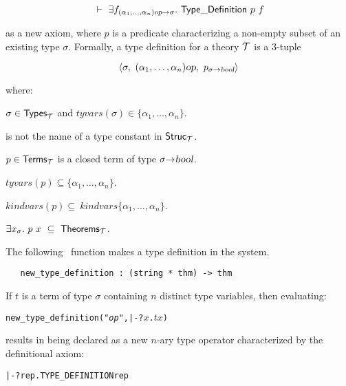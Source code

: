 \[\turn \equant{f_{(\alpha_1,\ldots,\alpha_n)\ty{op}\fun\sigma}}\TyDef\ p\ f\]

\noindent as a new axiom, where $p$ is a predicate
characterizing a
non-empty subset of an existing type $\sigma$.  Formally, a type definition
for a theory ${\cal T}$ is a $3$-tuple

\[ \langle \sigma,\ (\alpha_1,\ldots,\alpha_n)\ty{op},
    \ p_{\sigma\fun\ty{bool}}\rangle \]

\noindent where:

\begin{myenumerate}
\item $\sigma\in{\sf Types}_{\cal T}$  and
$tyvars(\sigma)\in\{\alpha_1, \ldots , \alpha_n\}$.
\item {} is not the name of a type constant in ${\sf Struc}_{\cal T}$.
\item $p\in{\sf Terms}_{\cal T}$ is a closed term of
type $\sigma{\to}\textsl{bool}$.
\item $tyvars(p)\subseteq\{\alpha_1, \ldots , \alpha_n\}$.
\item $kindvars(p)\subseteq\ kindvars\{\alpha_1, \ldots , \alpha_n\}$.
\item $\exists x_{\sigma}.\ p\ x \ \subseteq\ {\sf Theorems}_{\cal T}$.
\end{myenumerate}

The following \ML\ function makes a type definition in the \HOL{} system.

\begin{holboxed}
\begin{verbatim}
   new_type_definition : (string * thm) -> thm
\end{verbatim}\end{holboxed}

\noindent If $t$ is a term of type
$\sigma$ containing $n$ distinct type variables, then
evaluating:

{\def\op{{\normalsize\sl op}}
\begin{hol}
\begin{alltt}
   new_type_definition("{\op}", |- ?\(x\). \(t\) \(x\))
\end{alltt}
\end{hol}}

\noindent results in  being declared as a new $n$-ary type operator
characterized by the definitional
 axiom:
\begin{hol}
\begin{alltt}
   |- ?rep. TYPE\_DEFINITION  rep
\end{alltt}
\end{hol}


